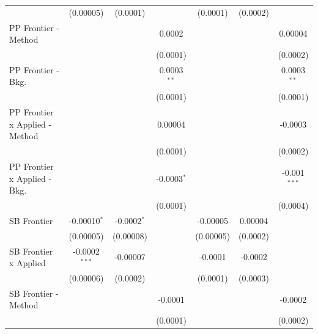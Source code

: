 \begin{tabular}{lcccccc}
                                  & (0.00005)       & (0.0001)        &                 & (0.0001)      & (0.0002)     &   \\   
   PP Frontier - Method           &                 &                 & 0.0002          &               &              & 0.00004\\   
                                  &                 &                 & (0.0001)        &               &              & (0.0002)\\   
   PP Frontier - Bkg.             &                 &                 & 0.0003$^{**}$   &               &              & 0.0003$^{**}$\\   
                                  &                 &                 & (0.0001)        &               &              & (0.0001)\\   
   PP Frontier x Applied - Method &                 &                 & 0.00004         &               &              & -0.0003\\   
                                  &                 &                 & (0.0001)        &               &              & (0.0002)\\   
   PP Frontier x Applied - Bkg.   &                 &                 & -0.0003$^{*}$   &               &              & -0.001$^{***}$\\   
                                  &                 &                 & (0.0001)        &               &              & (0.0004)\\   
   SB Frontier                    & -0.00010$^{*}$  & -0.0002$^{*}$   &                 & -0.00005      & 0.00004      &   \\   
                                  & (0.00005)       & (0.00008)       &                 & (0.00005)     & (0.0002)     &   \\   
   SB Frontier x Applied          & -0.0002$^{***}$ & -0.00007        &                 & -0.0001       & -0.0002      &   \\   
                                  & (0.00006)       & (0.0002)        &                 & (0.0001)      & (0.0003)     &   \\   
   SB Frontier - Method           &                 &                 & -0.0001         &               &              & -0.0002\\   
                                  &                 &                 & (0.0001)        &               &              & (0.0002)\\   

\end{tabular}
